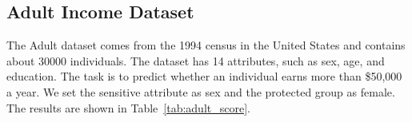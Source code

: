 \documentclass[manuscript,screen,review,anonymous]{acmart}
\begin{document}

\subsection{Adult Income Dataset}

The Adult\cite{adult_2,Kaggle_Adult_Census_Income} dataset comes from the 1994 census in the United States and contains about 30000 individuals. The dataset has 14 attributes, such as sex, age, and education. The task is to predict whether an individual earns more than \$50,000 a year. We set the sensitive attribute as sex and the protected group as female. The results are shown in Table~\ref{tab:adult_score}.


\end{document}
